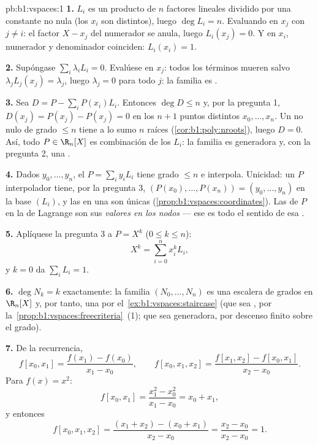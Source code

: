 \begin{solution}{pb:b1:vspaces:1}
\textbf{1.} $L_i$ es un producto de $n$ factores lineales dividido
por una constante no nula (los $x_i$ son distintos), luego
$\deg L_i = n$. Evaluando en $x_j$ con $j \neq i$: el factor
$X - x_j$ del numerador se anula, luego $L_i(x_j) = 0$. Y en $x_i$,
numerador y denominador coinciden: $L_i(x_i) = 1$.

\textbf{2.} Supóngase $\sum_i \lambda_i L_i = 0$. Evalúese en $x_j$:
todos los términos mueren salvo $\lambda_j L_j(x_j) = \lambda_j$,
luego $\lambda_j = 0$ para todo $j$: la familia es .

\textbf{3.} Sea $D = P - \sum_i P(x_i) L_i$. Entonces
$\deg D \leq n$ y, por la pregunta 1,
$D(x_j) = P(x_j) - P(x_j) = 0$ en los $n + 1$ puntos distintos
$x_0, \dots, x_n$. Un  no nulo de grado $\leq n$ tiene a lo
sumo $n$ raíces (\cref{cor:b1:poly:nroots}), luego $D = 0$. Así, todo
$P \in \R_n[X]$ es combinación de los $L_i$: la familia es generadora
y, con la pregunta 2, una .

\textbf{4.} Dados $y_0, \dots, y_n$, el 
$P = \sum_i y_i L_i$ tiene grado $\leq n$ e interpola. Unicidad: un
$P$ interpolador tiene, por la pregunta 3, 
$(P(x_0), \dots, P(x_n)) = (y_0, \dots, y_n)$ en la base $(L_i)$, y
las  en una  son únicas
(\cref{prop:b1:vspaces:coordinates}). Las  de $P$ en la
 de Lagrange son sus \emph{valores en los nodos} --- ese es todo
el sentido de esa .

\textbf{5.} Aplíquese la pregunta 3 a $P = X^k$ ($0 \leq k \leq n$):
\[
X^k = \sum_{i=0}^{n} x_i^{k} L_i ,
\]
y $k = 0$ da $\sum_i L_i = 1$.

\textbf{6.} $\deg N_k = k$ exactamente: la familia
$(N_0, \dots, N_n)$ es una escalera de grados en $\R_n[X]$ y, por
tanto, una  por el~\cref{ex:b1:vspaces:staircase} (que sea ,
por la~\cref{prop:b1:vspaces:freecriteria}~(1); que sea generadora,
por descenso finito sobre el grado).

\textbf{7.} De la recurrencia,
\[
f[x_0, x_1] = \frac{f(x_1) - f(x_0)}{x_1 - x_0},
\qquad
f[x_0, x_1, x_2] = \frac{f[x_1, x_2] - f[x_0, x_1]}{x_2 - x_0}.
\]
Para $f(x) = x^2$:
\[
f[x_0, x_1] = \frac{x_1^2 - x_0^2}{x_1 - x_0} = x_0 + x_1,
\]
y entonces
\[
f[x_0, x_1, x_2]
= \frac{(x_1 + x_2) - (x_0 + x_1)}{x_2 - x_0}
= \frac{x_2 - x_0}{x_2 - x_0} = 1 .
\]


\end{solution}
